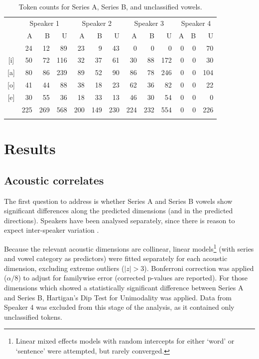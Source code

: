 \documentclass[output=paper
,newtxmath
,modfonts
,nonflat]{langsci/langscibook}
\begin{document}
\begin{table}
\begin{tabular}{c*{12}{r}}
\lsptoprule
   & \multicolumn{3}{c}{Speaker 1} & \multicolumn{3}{c}{Speaker 2} & \multicolumn{3}{c}{Speaker 3} & \multicolumn{3}{c}{Speaker 4} \\\cmidrule(lr){2-4}\cmidrule(lr){5-7}\cmidrule(lr){8-10}\cmidrule(lr){11-13}
   & {A}        & {B}       & {U}        & {A}        & {B}        & {U}       & {A}        & {B}       &{ U}        & {A}        & {B}	 & {U }        \\\midrule\relax
[u] & 24       & 12      & 89       & 23       & 9        & 43      & 0       & 0      & 0       &0&0& 70        \\
{[i]} & 50       & 72      & 116      & 32       & 37       & 61      & 30       & 88      & 172      &0&0& 30        \\
 {[a]} & 80       & 86      & 239      & 89       & 52       & 90      & 86       & 78      & 246      &0&0& 104       \\
 {[o]} & 41       & 44      & 88       & 38       & 18       & 23      & 62       & 36      & 82       &0&0& 22        \\
 {[e]} & 30       & 55      & 36       & 18       & 33       & 13      & 46       & 30      & 54       &0&0& 0       \\\midrule
 & 225	& 269		& 568		& 200		& 149		& 230	& 224		& 232		& 554		&0&0& 226\\
\lspbottomrule
\end{tabular}
\caption{Token counts for Series A, Series B, and unclassified vowels.}
\label{tab:kbgy:2}
\end{table}

\section{Results}
\label{results}

\subsection{Acoustic correlates}
\label{correlates}

The first question to address is whether Series A and Series B vowels show significant differences along the predicted dimensions (and in the predicted directions).  Speakers have been analysed separately, since there is reason to expect inter-speaker variation \citep{Andrzejewski1955}.

Because the relevant acoustic dimensions are collinear, linear models\footnote{Linear mixed effects models with random intercepts for either `word' or `sentence' were attempted, but rarely converged.} (with series and vowel category as predictors) were fitted separately for each acoustic dimension, excluding extreme outliers ($|z|>3$).  Bonferroni correction was applied ($\alpha/8$) to adjust for familywise error (corrected p-values are reported).  For those dimensions which showed a statistically significant difference between Series A and Series B, Hartigan's Dip Test for Unimodality was applied.  Data from Speaker 4 was excluded from this stage of the analysis, as it contained only unclassified tokens.
\end{document}
